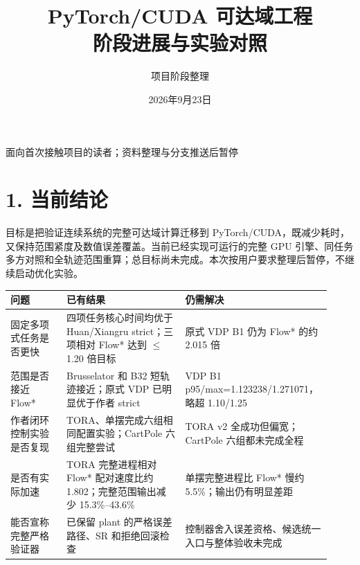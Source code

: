 \documentclass[UTF8,fontset=fandol,11pt,a4paper]{ctexart}
\title{\color{navy}PyTorch/CUDA 可达域工程\\阶段进展与实验对照}
\author{项目阶段整理}\date{2026年9月23日}
\begin{document}
\pagestyle{plain}\begin{titlepage}\maketitle\thispagestyle{empty}
\begin{center}面向首次接触项目的读者；资料整理与分支推送后暂停\end{center}
\end{titlepage}
{\setlength{\parskip}{0pt}\tableofcontents}\clearpage

\section*{1. 当前结论}
目标是把验证连续系统的完整可达域计算迁移到 PyTorch/\allowbreak{}CUDA，既减少耗时，又保持范围紧度及数值误差覆盖。当前已经实现可运行的完整 GPU 引擎、同任务多方对照和全轨迹范围重算；总目标尚未完成。本次按用户要求整理后暂停，不继续启动优化实验。

\small
\par\noindent
{\setlength{\tabcolsep}{2pt}\renewcommand{\arraystretch}{1.25}
\begin{tabular}{>{\raggedright\arraybackslash}p{0.175\linewidth}>{\raggedright\arraybackslash}p{0.368\linewidth}>{\raggedright\arraybackslash}p{0.377\linewidth}}
\toprule
\textbf{问题} & \textbf{已有结果} & \textbf{仍需解决} \\
\midrule
固定多项式任务是否更快 & 四项任务核心时间均优于 Huan/\allowbreak{}Xiangru strict；三项相对 Flow* 达到 $\leq$1.20 倍目标 & 原式 VDP B1 仍为 Flow* 的约 2.015 倍 \\
范围是否接近 Flow* & Brusselator 和 B32 短轨迹接近；原式 VDP 已明显优于作者 strict & VDP B1 p95/\allowbreak{}max=1.123238/\allowbreak{}1.271071，略超 1.10/\allowbreak{}1.25 \\
作者闭环控制实验是否复现 & TORA、单摆完成六组相同配置实验；CartPole 六组完整尝试 & TORA v2 全成功但偏宽；CartPole 六组都未完成全程 \\
是否有实际加速 & TORA 完整进程相对 Flow* 配对速度比约 1.802；完整范围输出减少 15.3\%–43.6\% & 单摆完整进程比 Flow* 慢约 5.5\%；输出仍有明显差距 \\
能否宣称完整严格验证器 & 已保留 plant 的严格误差路径、SR 和拒绝回滚检查 & 控制器舍入误差资格、候选统一入口与整体验收未完成 \\
\bottomrule
\end{tabular}
}
\par
\end{document}
